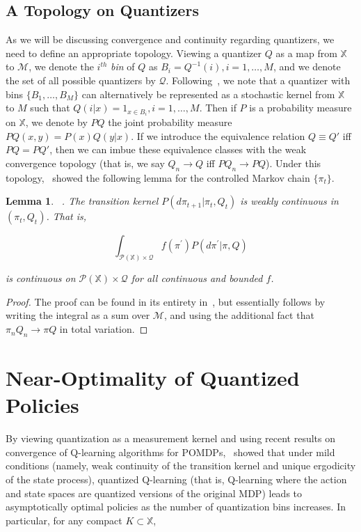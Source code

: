 \documentclass{article}
\newtheorem{lemma}[theorem]{Lemma}
\begin{document}
\subsection{A Topology on Quantizers}
As we will be discussing convergence and continuity regarding quantizers, we need to define an appropriate topology. Viewing a quantizer \( Q \) as a map from \( \mathbb{X} \) to \( \mathcal{M} \), we denote the \( i^{th} \) \emph{bin} of \( Q \) as \( B_i = Q^{-1}(i), i=1,\ldots,M \), and we denote the set of all possible quantizers by \( \mathcal{Q} \). Following~\cite{Linder}, we note that a quantizer with bins \( \{B_1,\ldots,B_M\} \) can alternatively be represented as a stochastic kernel from \( \mathbb{X} \) to \( M \) such that \( Q(i|x) = 1_{x \in B_i}, i=1,\ldots,M \). Then if \( P \) is a probability measure on \( \mathbb{X} \), we denote by \( PQ \) the joint probability measure \( PQ(x,y) = P(x)Q(y|x) \). If we introduce the equivalence relation \( Q \equiv Q' \) iff \( PQ = PQ' \), then we can imbue these equivalence classes with the weak convergence topology (that is, we say \( Q_n \to Q \) iff \( PQ_n \to PQ \)). Under this topology,~\cite{Linder} showed the following lemma for the controlled Markov chain \( \{\pi_t\} \).

\begin{lemma}\label{lemma:weak}~\cite[Lemma 11]{Linder}.
    The transition kernel \( P(d\pi_{t+1}|\pi_t,Q_t) \) is weakly continuous in \( (\pi_t,Q_t) \). That is,

    \[ \int_{\mathcal{P}(\mathbb{X}) \times \mathcal{Q}} f(\pi^{'})P(d \pi^{'}|\pi, Q) \]

    is continuous on \( \mathcal{P}(\mathbb{X}) \times \mathcal{Q} \) for all continuous and bounded \(f\).
\end{lemma}

\begin{proof}
    The proof can be found in its entirety in~\cite{Linder}, but essentially follows by writing the integral as a sum over \( \mathcal{M} \), and using the additional fact that \( \pi_n Q_n \to \pi Q \) in total variation.
\end{proof}

\section{Near-Optimality of Quantized Policies}
By viewing quantization as a measurement kernel and using recent results on convergence of Q-learning algorithms for POMDPs,~\cite{Kara} showed that under mild conditions (namely, weak continuity of the transition kernel and unique ergodicity of the state process), quantized Q-learning (that is, Q-learning where the action and state spaces are quantized versions of the original MDP) leads to asymptotically optimal policies as the number of quantization bins increases. In particular, for any compact \( K \subset \mathbb{X} \),
\end{document}
